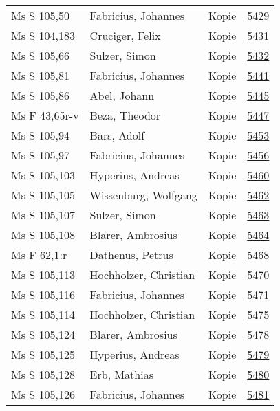 \documentclass[10pt,a4paper,landscape]{report}
\begin{document}
\begin{longtable}{p{16cm}p{4cm}lr}
Ms S 105,50	&	Fabricius, Johannes	&	Kopie	&	\href{http://130.60.24.72/assignment/5429}{5429}\\
Ms S 104,183	&	Cruciger, Felix	&	Kopie	&	\href{http://130.60.24.72/assignment/5431}{5431}\\
Ms S 105,66	&	Sulzer, Simon	&	Kopie	&	\href{http://130.60.24.72/assignment/5432}{5432}\\
Ms S 105,81	&	Fabricius, Johannes	&	Kopie	&	\href{http://130.60.24.72/assignment/5441}{5441}\\
Ms S 105,86	&	Abel, Johann	&	Kopie	&	\href{http://130.60.24.72/assignment/5445}{5445}\\
Ms F 43,65r-v	&	Beza, Theodor	&	Kopie	&	\href{http://130.60.24.72/assignment/5447}{5447}\\
Ms S 105,94	&	Bars, Adolf	&	Kopie	&	\href{http://130.60.24.72/assignment/5453}{5453}\\
Ms S 105,97	&	Fabricius, Johannes	&	Kopie	&	\href{http://130.60.24.72/assignment/5456}{5456}\\
Ms S 105,103	&	Hyperius, Andreas	&	Kopie	&	\href{http://130.60.24.72/assignment/5460}{5460}\\
Ms S 105,105	&	Wissenburg, Wolfgang	&	Kopie	&	\href{http://130.60.24.72/assignment/5462}{5462}\\
Ms S 105,107	&	Sulzer, Simon	&	Kopie	&	\href{http://130.60.24.72/assignment/5463}{5463}\\
Ms S 105,108	&	Blarer, Ambrosius	&	Kopie	&	\href{http://130.60.24.72/assignment/5464}{5464}\\
Ms F 62,1:r	&	Dathenus, Petrus	&	Kopie	&	\href{http://130.60.24.72/assignment/5468}{5468}\\
Ms S 105,113	&	Hochholzer, Christian	&	Kopie	&	\href{http://130.60.24.72/assignment/5470}{5470}\\
Ms S 105,116	&	Fabricius, Johannes	&	Kopie	&	\href{http://130.60.24.72/assignment/5471}{5471}\\
Ms S 105,114	&	Hochholzer, Christian	&	Kopie	&	\href{http://130.60.24.72/assignment/5475}{5475}\\
Ms S 105,124	&	Blarer, Ambrosius	&	Kopie	&	\href{http://130.60.24.72/assignment/5478}{5478}\\
Ms S 105,125	&	Hyperius, Andreas	&	Kopie	&	\href{http://130.60.24.72/assignment/5479}{5479}\\
Ms S 105,128	&	Erb, Mathias	&	Kopie	&	\href{http://130.60.24.72/assignment/5480}{5480}\\
Ms S 105,126	&	Fabricius, Johannes	&	Kopie	&	\href{http://130.60.24.72/assignment/5481}{5481}\\

\end{longtable}
\end{document}
